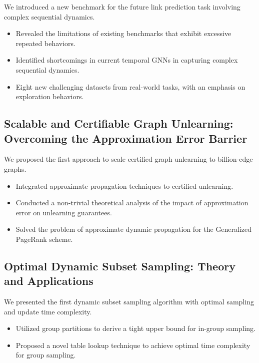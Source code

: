 \documentclass{resume}
\begin{document}
We introduced a new benchmark for the future link prediction task involving complex sequential dynamics.
\begin{itemize}
  \item Revealed the limitations of existing benchmarks that exhibit excessive repeated behaviors.
  \item Identified shortcomings in current temporal GNNs in capturing complex sequential dynamics.
  \item Eight new challenging datasets from real-world tasks, with an emphasis on exploration behaviors.
\end{itemize}

\subsection{{\bf Scalable and Certifiable Graph Unlearning: Overcoming the Approximation Error Barrier} }

We proposed the first approach to scale certified graph unlearning to billion-edge graphs.
\begin{itemize}
  \item Integrated approximate propagation techniques to certified unlearning.
  \item Conducted a non-trivial theoretical analysis of the impact of approximation error on unlearning guarantees.
  \item Solved the problem of approximate dynamic propagation for the Generalized PageRank scheme.
\end{itemize}

\subsection{\bf Optimal Dynamic Subset Sampling: Theory and Applications} 

We presented the first dynamic subset sampling algorithm with optimal sampling and update time complexity.
\begin{itemize}
  \item Utilized group partitions to derive a tight upper bound for in-group sampling.
  \item Proposed a novel table lookup technique to achieve optimal time complexity for group sampling.
\end{itemize}
\end{document}
